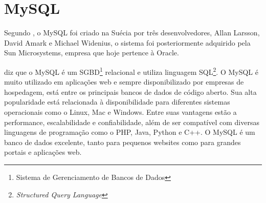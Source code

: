 \section{MySQL}
	\par Segundo , o MySQL foi criado na Suécia por três desenvolvedores, Allan Larsson, David Amark e Michael Widenius, o sistema foi posteriormente adquirido pela Sun Microsystems, empresa que hoje pertence à Oracle.
	\par {} diz que o MySQL é um SGBD\footnote{Sistema de Gerenciamento de Bancos de Dados} relacional e utiliza linguagem SQL\footnote{\textit{Structured Query Language}}. O MySQL é muito utilizado em aplicações web e sempre disponibilizado por empresas de hospedagem, está entre os principais bancos de dados de código aberto. Sua alta popularidade está relacionada à disponibilidade para diferentes sistemas operacionais como o Linux, Mac e Windows. Entre suas vantagens estão a performance, escalabilidade e confiabilidade, além de ser compatível com diversas linguagens de programação como o PHP, Java, Python e C++. O MySQL é um banco de dados excelente, tanto para pequenos websites como para grandes portais e aplicações web.



